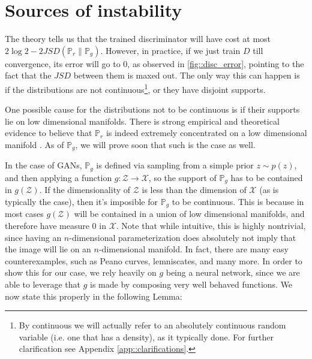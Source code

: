 \documentclass{article} %
\newcommand\PP{\mathbb{P}}
\theoremstyle{definition}
\begin{document}
\section{Sources of instability}
The theory tells us that the
trained discriminator will have cost %
at most $2 \log 2 - 2JSD(\PP_r \| \PP_g)$. However, in practice, if we just
train $D$ till convergence, its error will go to 0, as observed
in \autoref{fig::disc_error}, pointing to the fact that the $JSD$
between them is maxed out. The only way this can happen is if
the distributions are not continuous\footnote{By continuous
we will actually refer to an absolutely continuous random variable (i.e. one that
has a density),
as it typically done. For further clarification see Appendix \autoref{app::clarifications}.}, or they have disjoint supports.

One possible cause for the distributions not to be continuous is if
their supports lie on low dimensional manifolds. There is strong empirical
and theoretical evidence to believe that $\PP_r$ is indeed extremely concentrated
on a low dimensional manifold \citep{Har-Manh}. As of $\PP_g$, we will
prove soon that such is the case as well.

In the case of GANs, $\PP_g$ is defined via sampling from
a simple prior $z \sim p(z)$, and then applying a function
$g: \mathcal{Z} \rightarrow \mathcal{X}$, so the support of $\PP_g$ has
to be contained in $g(\mathcal{Z})$. If the dimensionality of $\mathcal{Z}$
is less than the dimension of $\mathcal{X}$ (as is typically the case), then
it's imposible for $\PP_g$ to be continuous. This is because in most cases $g(\mathcal{Z})$ will
be contained in a union of low dimensional manifolds, and therefore have measure
0 in $\mathcal{X}$. Note that while intuitive, this is highly nontrivial,
since having an $n$-dimensional parameterization does absolutely not
imply that the image will lie on an $n$-dimensional manifold. In fact,
there are many easy counterexamples, such as Peano curves, lemniscates,
and many more. In order to show this for our case, we rely heavily
on $g$ being a neural network, since we are able to leverage that
$g$ is made by composing very well behaved functions. We now
state this properly in the following Lemma:
\end{document}
